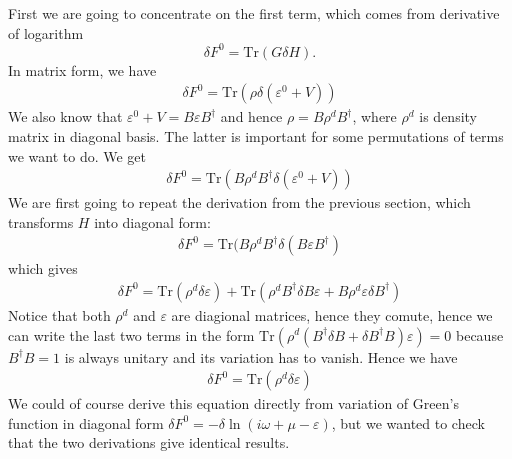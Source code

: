 \documentclass[aps,prb,floatfix,epsfig,singlecolumn,showpacs,preprintnumbers]{revtex4}
\newcommand{\Tr}{\mathrm{Tr}}
\begin{document}
First we are going to concentrate on the first term, which comes from
derivative of logarithm 
$$\delta F^0 = \Tr(G \delta H).$$
In matrix form, we have
\begin{eqnarray}
\delta F^0 = \Tr(\rho \delta(\varepsilon^0+V))
\end{eqnarray}
We also know that $\varepsilon^0+V = B\varepsilon B^\dagger$ and hence
$\rho = B \rho^d B^\dagger$, where $\rho^d$ is density matrix in
diagonal basis. The latter is important for some permutations of terms
we want to do. We get
\begin{eqnarray}
\delta F^0 = \Tr(B \rho^d B^{\dagger} \delta(\varepsilon^0+V)) 
\label{Eq:232}
\end{eqnarray}
We are first going to repeat the derivation from the previous section,
which transforms $H$ into diagonal form:
\begin{eqnarray}
\delta F^0 = \Tr(B \rho^d B^{\dagger} \delta( B\varepsilon B^\dagger )
\end{eqnarray}
which gives
\begin{eqnarray}
\delta F^0 = \Tr(\rho^d \delta \varepsilon) + \Tr(\rho^d B^\dagger  \delta B \varepsilon  + B\rho^d \varepsilon \delta B^\dagger)
\end{eqnarray}
Notice that both $\rho^d$ and $\varepsilon$ are diagional matrices,
hence they comute, hence we can write the last two terms in the form
$\Tr(\rho^d (B^\dagger  \delta B  + \delta B^\dagger B)\varepsilon)=0$ because 
$B^\dagger B=1$ is always unitary and its variation has to
vanish. Hence we have
\begin{eqnarray}
\delta F^0 = \Tr(\rho^d \delta \varepsilon)
\end{eqnarray}
We could of course derive this equation directly from variation of
Green's function in diagonal form $\delta F^0=-\delta \ln (i\omega+\mu-\varepsilon)$, but we wanted to
check that the two derivations give identical results.
\end{document}
